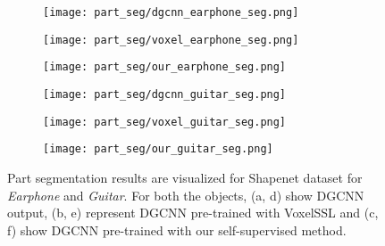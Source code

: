 \documentclass{article}
\begin{document}
\begin{figure}[tbp]
	\centering
	\begin{subfigure}{.16\textwidth}
		\centering
		\texttt{[image: part\_seg/dgcnn\_earphone\_seg.png]}
		\caption{}
		\label{fig:seg1}
	\end{subfigure}\begin{subfigure}{.16\textwidth}
		\centering
		\texttt{[image: part\_seg/voxel\_earphone\_seg.png]}
		\caption{}
		\label{fig:seg2}
	\end{subfigure}\begin{subfigure}{.16\textwidth}
		\centering
		\texttt{[image: part\_seg/our\_earphone\_seg.png]}
		\caption{}
		\label{fig:seg3}
	\end{subfigure}\begin{subfigure}{.16\textwidth}
		\centering
		\texttt{[image: part\_seg/dgcnn\_guitar\_seg.png]}
		\caption{}
		\label{fig:seg4}
	\end{subfigure}\begin{subfigure}{.16\textwidth}
		\centering
		\texttt{[image: part\_seg/voxel\_guitar\_seg.png]}
		\caption{}
		\label{fig:seg5}
	\end{subfigure}\begin{subfigure}{.16\textwidth}
		\centering
		\texttt{[image: part\_seg/our\_guitar\_seg.png]}
		\caption{}
		\label{fig:seg6}
	\end{subfigure}
	
	\caption{Part segmentation results are visualized for Shapenet dataset for \emph{Earphone} and \emph{Guitar}. For both the objects, (a, d) show DGCNN output, (b, e) represent DGCNN pre-trained with VoxelSSL and (c, f) show DGCNN pre-trained with our self-supervised method.}
	\label{fig:partseg}
\end{figure}
\end{document}
